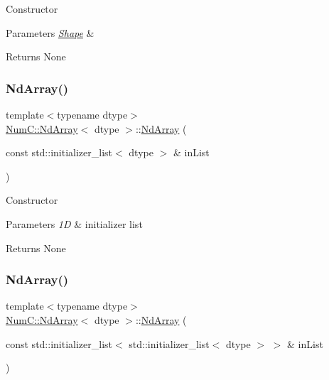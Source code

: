 Constructor


\begin{DoxyParams}{Parameters}
{\em \mbox{\hyperlink{class_num_c_1_1_shape}{Shape}}} & \\
\hline
\end{DoxyParams}
\begin{DoxyReturn}{Returns}
None 
\end{DoxyReturn}
\mbox{\label{class_num_c_1_1_nd_array_a4ecc3daedaeb2adfb84ae8e5f787e28a}} 
\subsubsection{\texorpdfstring{Nd\+Array()}{NdArray()}\hspace{0.1cm}{\footnotesize\ttfamily [5/12]}}
{\footnotesize\ttfamily template$<$typename dtype$>$ \\
\mbox{\hyperlink{class_num_c_1_1_nd_array}{Num\+C\+::\+Nd\+Array}}$<$ dtype $>$\+::\mbox{\hyperlink{class_num_c_1_1_nd_array}{Nd\+Array}} (\begin{DoxyParamCaption}\item[{const std\+::initializer\+\_\+list$<$ dtype $>$ \&}]{in\+List }\end{DoxyParamCaption})\hspace{0.3cm}{\ttfamily [inline]}}

Constructor


\begin{DoxyParams}{Parameters}
{\em 1D} & initializer list \\
\hline
\end{DoxyParams}
\begin{DoxyReturn}{Returns}
None 
\end{DoxyReturn}
\mbox{\label{class_num_c_1_1_nd_array_ab61e6e97567dfd64044e7de9f532e2be}} 
\subsubsection{\texorpdfstring{Nd\+Array()}{NdArray()}\hspace{0.1cm}{\footnotesize\ttfamily [6/12]}}
{\footnotesize\ttfamily template$<$typename dtype$>$ \\
\mbox{\hyperlink{class_num_c_1_1_nd_array}{Num\+C\+::\+Nd\+Array}}$<$ dtype $>$\+::\mbox{\hyperlink{class_num_c_1_1_nd_array}{Nd\+Array}} (\begin{DoxyParamCaption}\item[{const std\+::initializer\+\_\+list$<$ std\+::initializer\+\_\+list$<$ dtype $>$ $>$ \&}]{in\+List }\end{DoxyParamCaption})\hspace{0.3cm}{\ttfamily [inline]}}

